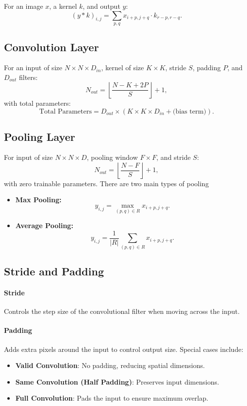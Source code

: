 \documentclass{article}
\begin{document}
For an image \(x\), a kernel \(k\), and output \(y\):
\[
(y * k)_{i,j} = \sum_{p,q} x_{i+p,j+q} \cdot k_{r-p, r-q}.
\]

\subsection{Convolution Layer}
For an input of size \(N \times N \times D_{in}\), kernel of size \(K \times K\), stride \(S\), padding \(P\), and \(D_{out}\) filters:
\[
N_{out} = \left\lfloor \frac{N - K + 2P}{S} \right\rfloor + 1,
\]
with total parameters:
\[
\text{Total Parameters} = D_{out} \times \left( K \times K \times D_{in} + \text{(bias term)} \right).
\]

\subsection{Pooling Layer}
For input of size \(N \times N \times D\), pooling window \(F \times F\), and stride \(S\):
\[
N_{out} = \left\lfloor \frac{N - F}{S} \right\rfloor + 1,
\]
with zero trainable parameters. There are two main types of pooling

\begin{itemize}
    \item \textbf{Max Pooling:}
    \[
    y_{i,j} = \max_{(p,q) \in R} x_{i+p, j+q}.
    \]
    \item \textbf{Average Pooling:}
    \[
    y_{i,j} = \frac{1}{|R|} \sum_{(p,q) \in R} x_{i+p, j+q}.
    \]
\end{itemize}


\subsection{Stride and Padding}
\paragraph{Stride} Controls the step size of the convolutional filter when moving across the input.

\paragraph{Padding} Adds extra pixels around the input to control output size. Special cases include:
\begin{itemize}
    \item \textbf{Valid Convolution}: No padding, reducing spatial dimensions.
    \item \textbf{Same Convolution (Half Padding)}: Preserves input dimensions.
    \item \textbf{Full Convolution}: Pads the input to ensure maximum overlap.
\end{itemize}
\end{document}
